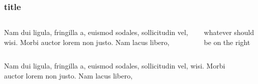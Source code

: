 \documentclass{beamer}
\begin{document}
\begin{frame}
    \frametitle{title}
    \begin{columns}[t]
        \begin{column}{.48\textwidth}
                Nam dui ligula, fringilla a, euismod sodales, sollicitudin vel, wisi. Morbi auctor lorem non justo. Nam lacus libero, 
        \end{column}
        \begin{column}{.48\textwidth}
                whatever should be on the right
        \end{column}        
    \end{columns}
    \vfill
    \begin{columns}[t]
        \begin{column}{.48\textwidth}
                Nam dui ligula, fringilla a, euismod sodales, sollicitudin vel, wisi. Morbi auctor lorem non justo. Nam lacus libero, 
        \end{column}
        \begin{column}{.48\textwidth}

        \end{column}        
    \end{columns}   
\end{frame}
\end{document}
